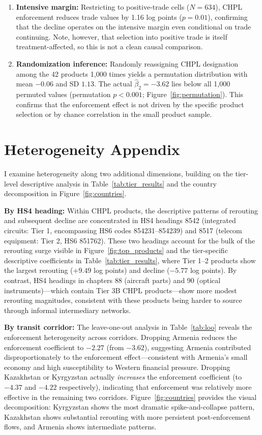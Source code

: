 \documentclass[12pt]{article}
\begin{document}
\begin{enumerate}
\item \textbf{Intensive margin:} Restricting to positive-trade cells ($N = 634$), CHPL enforcement reduces trade values by 1.16 log points ($p = 0.01$), confirming that the decline operates on the intensive margin even conditional on trade continuing. Note, however, that selection into positive trade is itself treatment-affected, so this is not a clean causal comparison.
\item \textbf{Randomization inference:} Randomly reassigning CHPL designation among the 42 products 1,000 times yields a permutation distribution with mean $-0.06$ and SD $1.13$. The actual $\hat{\beta}_2 = -3.62$ lies below all 1,000 permuted values (permutation $p < 0.001$; Figure~\ref{fig:permutation}). This confirms that the enforcement effect is not driven by the specific product selection or by chance correlation in the small product sample.
\end{enumerate}


\section{Heterogeneity Appendix}
\label{app:heterogeneity}

I examine heterogeneity along two additional dimensions, building on the tier-level descriptive analysis in Table~\ref{tab:tier_results} and the country decomposition in Figure~\ref{fig:countries}.

\textbf{By HS4 heading:} Within CHPL products, the descriptive patterns of rerouting and subsequent decline are concentrated in HS4 headings 8542 (integrated circuits: Tier 1, encompassing HS6 codes 854231--854239) and 8517 (telecom equipment: Tier 2, HS6 851762). These two headings account for the bulk of the rerouting surge visible in Figure~\ref{fig:top_products} and the tier-specific descriptive coefficients in Table~\ref{tab:tier_results}, where Tier 1--2 products show the largest rerouting ($+9.49$ log points) and decline ($-5.77$ log points). By contrast, HS4 headings in chapters 88 (aircraft parts) and 90 (optical instruments)---which contain Tier 3B CHPL products---show more modest rerouting magnitudes, consistent with these products being harder to source through informal intermediary networks.

\textbf{By transit corridor:} The leave-one-out analysis in Table~\ref{tab:loo} reveals the enforcement heterogeneity across corridors. Dropping Armenia reduces the enforcement coefficient to $-2.27$ (from $-3.62$), suggesting Armenia contributed disproportionately to the enforcement effect---consistent with Armenia's small economy and high susceptibility to Western financial pressure. Dropping Kazakhstan or Kyrgyzstan actually \textit{increases} the enforcement coefficient (to $-4.37$ and $-4.22$ respectively), indicating that enforcement was relatively more effective in the remaining two corridors. Figure~\ref{fig:countries} provides the visual decomposition: Kyrgyzstan shows the most dramatic spike-and-collapse pattern, Kazakhstan shows substantial rerouting with more persistent post-enforcement flows, and Armenia shows intermediate patterns.
\end{document}
